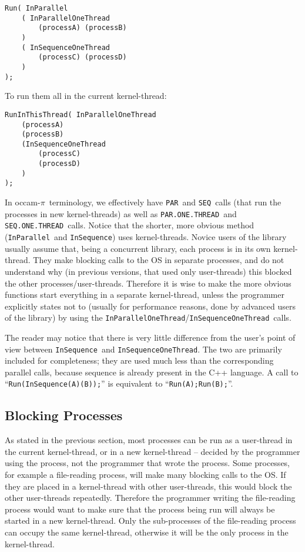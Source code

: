 \documentclass[12pt]{IOS-Book-Article-CPA-2007}
\newcommand{\occampi}{occam-$\pi$}
\newcommand{\code}[1]{{\small\texttt{#1}}}
\begin{document}
{\small\begin{verbatim}
Run( InParallel
    ( InParallelOneThread 
        (processA) (processB) 
    )
    ( InSequenceOneThread 
        (processC) (processD) 
    )
);
\end{verbatim}}

To run them all in the current kernel-thread:

{\small\begin{verbatim}
RunInThisThread( InParallelOneThread
    (processA)
    (processB)
    (InSequenceOneThread
        (processC)
        (processD)
    )
);
\end{verbatim}}

In \occampi~terminology, we effectively have \code{PAR}~and \code{SEQ}~calls (that run the processes in new kernel-threads) as well as \code{PAR.ONE.THREAD}~and 
\code{SEQ.ONE.THREAD}~calls.  Notice that the shorter,
more obvious method (\code{InParallel}~and \code{InSequence}) uses kernel-threads.  Novice users of the library usually assume that, being 
a concurrent library, each process is in its own kernel-thread.  They make blocking calls to the OS in separate processes, and do not understand why (in previous versions, that used only user-threads) this
blocked the other processes/user-threads.  Therefore it is wise to make the more obvious functions start everything in a separate kernel-thread, unless the programmer explicitly
states not to (usually for performance reasons, done by advanced users of the library) by using the \code{InParallelOneThread}/\code{InSequenceOneThread}~calls.

The reader may notice that there is very little difference from the user's point of view between \code{InSequence}~and \code{InSequenceOneThread}.  
The two are primarily included for completeness; they are used much less than the corresponding parallel calls, because sequence is already present in 
the C++ language.  A call to ``\code{Run(InSequence(A)(B));}'' is equivalent to ``\code{Run(A);Run(B);}''.

\subsection{Blocking Processes}
\label{sec-threadcsprocess}

As stated in the previous section, most processes can be run as a user-thread in the current kernel-thread, or in a new kernel-thread -- decided by the
programmer using the process, not the programmer that wrote the process.  Some processes, for example a file-reading process, will make
many blocking calls to the OS.  If they are placed in a kernel-thread with other user-threads, this would block the other user-threads repeatedly.  Therefore
the programmer writing the file-reading process would want to make sure that the process being run will always be started in a new kernel-thread.  Only
the sub-processes of the file-reading process can occupy the same kernel-thread, otherwise it will be the only process in the kernel-thread.  
\end{document}
